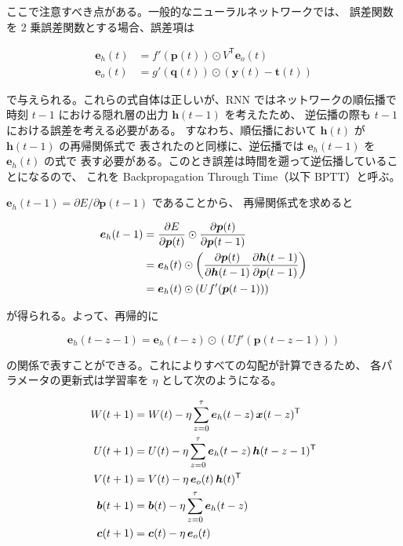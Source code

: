 \documentclass[a4paper,11pt,openany]{ltjsreport}
\begin{document}
ここで注意すべき点がある。一般的なニューラルネットワークでは、
誤差関数を 2 乗誤差関数とする場合、誤差項は

\begin{align}
  \bm{e}_h(t) &= f'(\bm{p}(t)) \odot V^{\mathsf{T}}\bm{e}_o(t) \label{eq:eh}\\
  \bm{e}_o(t) &= g'(\bm{q}(t)) \odot \left(\bm{y}(t) - \bm{t}(t)\right) \label{eq:eo}
\end{align}

で与えられる。これらの式自体は正しいが、RNN ではネットワークの順伝播で
時刻 $t-1$ における隠れ層の出力 $\bm{h}(t-1)$ を考えたため、
逆伝播の際も $t-1$ における誤差を考える必要がある。
すなわち、順伝播において $\bm{h}(t)$ が $\bm{h}(t-1)$ の再帰関係式で
表されたのと同様に、逆伝播では $\bm{e}_h(t-1)$ を $\bm{e}_h(t)$ の式で
表す必要がある。このとき誤差は時間を遡って逆伝播していることになるので、
これを Backpropagation Through Time（以下 BPTT）と呼ぶ\cite{werbos1990}。

$\bm{e}_h(t-1) = \partial E / \partial \bm{p}(t-1)$ であることから、
再帰関係式を求めると

\begin{align}
  \bm{e}_h(t-1)
   &= \frac{\partial E}{\partial \bm{p}(t)} \odot \frac{\partial \bm{p}(t)}{\partial \bm{p}(t-1)} \notag\\
   &= \bm{e}_h(t) \odot \left(
        \frac{\partial \bm{p}(t)}{\partial \bm{h}(t-1)}
        \frac{\partial \bm{h}(t-1)}{\partial \bm{p}(t-1)} \right) \label{eq:bptt}\\
   &= \bm{e}_h(t) \odot \left( U f'(\bm{p}(t-1)) \right) \notag
\end{align}

が得られる。よって、再帰的に

\begin{equation}
  \bm{e}_h(t-z-1) = \bm{e}_h(t-z) \odot \left( U f'(\bm{p}(t-z-1)) \right)
  \label{eq:bptt_z}
\end{equation}

の関係で表すことができる。これによりすべての勾配が計算できるため、
各パラメータの更新式は学習率を $\eta$ として次のようになる。

\begin{align}
  W(t+1) &= W(t) - \eta \sum_{z=0}^{\tau} \bm{e}_h(t-z)\,\bm{x}(t-z)^{\mathsf{T}} \notag\\
  U(t+1) &= U(t) - \eta \sum_{z=0}^{\tau} \bm{e}_h(t-z)\,\bm{h}(t-z-1)^{\mathsf{T}} \notag\\
  V(t+1) &= V(t) - \eta\, \bm{e}_o(t)\,\bm{h}(t)^{\mathsf{T}} \label{eq:update}\\
  \bm{b}(t+1) &= \bm{b}(t) - \eta \sum_{z=0}^{\tau} \bm{e}_h(t-z) \notag\\
  \bm{c}(t+1) &= \bm{c}(t) - \eta\, \bm{e}_o(t) \notag
\end{align}
\end{document}
